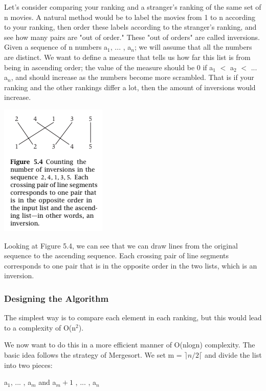 \documentclass{article}
\begin{document}
Let's consider comparing your ranking and a stranger's ranking of the same set of n movies. A natural method would be to label the movies from 1 to n according to your ranking, then order these labels according to the stranger's ranking, and see how many pairs are "out of order." These "out of orders" are called inversions. Given a sequence of n numbers a$_1$, ... , a$_n$; we will assume that all the numbers are distinct. We want to define a measure that tells us how far this list is from being in ascending order; the value of the measure should be 0 if a$_1$ $<$ a$_2$ $<$ ... a$_n$, and should increase as the numbers become more scrambled. That is if your ranking and the other rankings differ a lot, then the amount of inversions would increase.

\begin{center}
    \includegraphics[]{figures/fig2.png}
\end{center}

Looking at Figure 5.4, we can see that we can draw lines from the original sequence to the ascending sequence. Each crossing pair of line segments corresponds to one pair that is in the opposite order in the two lists, which is an inversion.

\subsubsection{Designing the Algorithm}
The simplest way is to compare each element in each ranking, but this would lead to a complexity of O(n$^2$). 

\medskip

We now want to do this in a more efficient manner of O(nlogn) complexity. The basic idea follows the strategy of Mergesort. We set m = $\rceil n/2 \lceil$ and divide the list into two pieces:

\medskip

\begin{center}
    a$_1$, ... , a$_m$ and a$_m+1$ , ... , a$_n$
\end{center}
\end{document}
